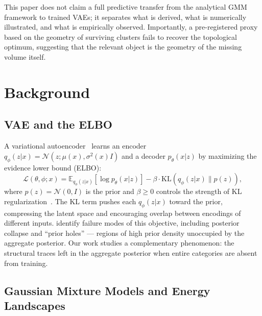 \documentclass[11pt]{article}
\begin{document}
\noindent This paper does not claim a full predictive transfer from the
analytical GMM framework to trained VAEs; it separates what is derived,
what is numerically illustrated, and what is empirically observed.
Importantly, a pre-registered proxy based on the geometry of surviving
clusters fails to recover the topological optimum, suggesting that the
relevant object is the geometry of the missing volume itself.


\section{Background}
\label{sec:background}

\subsection{VAE and the ELBO}
\label{sec:vae}

A variational autoencoder~\citep{kingma2014auto} learns an encoder
$q_\phi(z|x) = \mathcal{N}(z; \mu(x), \sigma^2(x)I)$ and a decoder
$p_\theta(x|z)$ by maximizing the evidence lower bound (ELBO):
\begin{equation}
\label{eq:elbo}
\mathcal{L}(\theta, \phi; x) =
  \mathbb{E}_{q_\phi(z|x)}[\log p_\theta(x|z)]
  - \beta \cdot \mathrm{KL}(q_\phi(z|x) \| p(z)),
\end{equation}
where $p(z) = \mathcal{N}(0, I)$ is the prior and $\beta \geq 0$ controls
the strength of KL regularization~\citep{higgins2017betavae}.
The KL term pushes each $q_\phi(z|x)$ toward the prior, compressing the
latent space and encouraging overlap between encodings of different inputs.
\citet{dai2019diagnosing} identify failure modes of this objective, including
posterior collapse and ``prior holes'' --- regions of high prior density
unoccupied by the aggregate posterior.
Our work studies a complementary phenomenon: the structural traces left in
the aggregate posterior when entire categories are absent from training.


\subsection{Gaussian Mixture Models and Energy Landscapes}
\label{sec:gmm}
\end{document}
